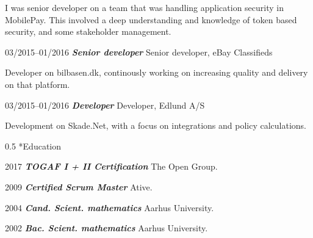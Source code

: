 \documentclass[10pt,a4,sans]{article}
\makeatletter
\renewcommand{\section}{\@startsection{section}{12}
{0mm} 
{0.8\baselineskip} %
{0.5\baselineskip} %
{\Large\scshape
\vspace{0.5\baselineskip}
}}
\makeatother
\begin{document}
\begin{CV}
I was senior developer on a team that was handling application security in MobilePay. This involved a deep understanding and knowledge of token based security, and some stakeholder management.

    \item[03/2015--01/2016] \textbf{\emph{Senior developer}} Senior developer, eBay Classifieds 
    
    Developer on bilbasen.dk, continously working on increasing quality and delivery on that platform.

    \item[03/2015--01/2016] \textbf{\emph{Developer}} Developer, Edlund A/S 
    
    Development on Skade.Net, with a focus on integrations and policy calculations.
    
\end{CV}

\section*{Education}

\begin{CV}
    \item[2017] \textbf{\emph{TOGAF I + II Certification}} The Open Group.
    \item[2009] \textbf{\emph{Certified Scrum Master}} Ative.
    \item[2004] \textbf{\emph{Cand. Scient. mathematics}} Aarhus University.
    \item[2002] \textbf{\emph{Bac. Scient. mathematics}} Aarhus University.
\end{CV}
\end{document}
